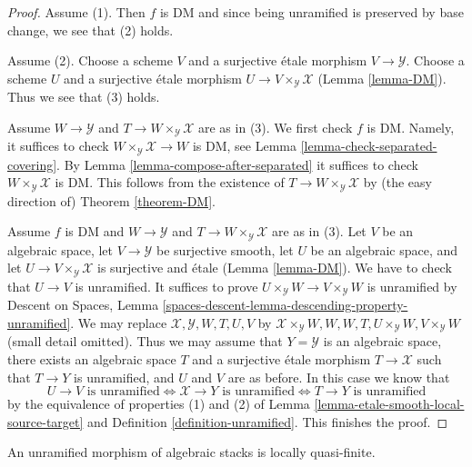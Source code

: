 \begin{proof}
Assume (1). Then $f$ is DM and since being unramified is preserved
by base change, we see that (2) holds.

\medskip\noindent
Assume (2). Choose a scheme $V$ and a surjective \'etale morphism
$V \to \mathcal{Y}$. Choose a scheme $U$ and a surjective \'etale morphism
$U \to V \times_\mathcal{Y} \mathcal{X}$ (Lemma \ref{lemma-DM}).
Thus we see that (3) holds.

\medskip\noindent
Assume $W \to \mathcal{Y}$ and $T \to W \times_\mathcal{Y} \mathcal{X}$
are as in (3). We first check $f$ is DM. Namely, it suffices to check
$W \times_\mathcal{Y} \mathcal{X} \to W$ is DM, see
Lemma \ref{lemma-check-separated-covering}.
By Lemma \ref{lemma-compose-after-separated}
it suffices to check $W \times_\mathcal{Y} \mathcal{X}$ is DM.
This follows from the existence of $T \to W \times_\mathcal{Y} \mathcal{X}$
by (the easy direction of) Theorem \ref{theorem-DM}.

\medskip\noindent
Assume $f$ is DM and $W \to \mathcal{Y}$ and
$T \to W \times_\mathcal{Y} \mathcal{X}$ are as in (3).
Let $V$ be an algebraic space, let $V \to \mathcal{Y}$ be surjective smooth,
let $U$ be an algebraic space, and let
$U \to V \times_\mathcal{Y} \mathcal{X}$ is surjective and \'etale
(Lemma \ref{lemma-DM}). We have to check that $U \to V$ is unramified.
It suffices to prove $U \times_\mathcal{Y} W \to V \times_\mathcal{Y} W$
is unramified by Descent on Spaces, Lemma
\ref{spaces-descent-lemma-descending-property-unramified}.
We may replace $\mathcal{X}, \mathcal{Y}, W, T, U, V$ by
$\mathcal{X} \times_\mathcal{Y} W, W, W, T, U \times_\mathcal{Y} W,
V \times_\mathcal{Y} W$ (small detail omitted).
Thus we may assume that $Y = \mathcal{Y}$ is an algebraic space, there exists
an algebraic space $T$ and a surjective \'etale morphism
$T \to \mathcal{X}$ such that $T \to Y$ is unramified, and $U$ and $V$
are as before. In this case we know that
$$
U \to V\text{ is unramified}
\Leftrightarrow
\mathcal{X} \to Y\text{ is unramified}
\Leftrightarrow
T \to Y\text{ is unramified}
$$
by the equivalence of properties (1) and (2) of
Lemma \ref{lemma-etale-smooth-local-source-target}
and Definition \ref{definition-unramified}.
This finishes the proof.
\end{proof}

\begin{lemma}
\label{lemma-unramified-quasi-finite}
An unramified morphism of algebraic stacks is locally quasi-finite.
\end{lemma}


